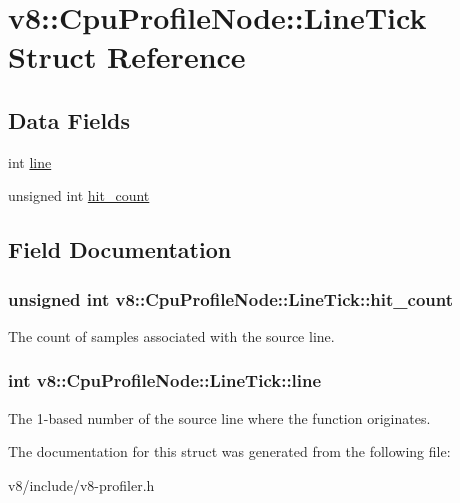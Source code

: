 \hypertarget{structv8_1_1CpuProfileNode_1_1LineTick}{}\section{v8\+:\+:Cpu\+Profile\+Node\+:\+:Line\+Tick Struct Reference}
\label{structv8_1_1CpuProfileNode_1_1LineTick}
\subsection*{Data Fields}
\begin{DoxyCompactItemize}
\item 
int \hyperlink{structv8_1_1CpuProfileNode_1_1LineTick_af96fbdefbc07b2c84cf41d74555626f6}{line}
\item 
unsigned int \hyperlink{structv8_1_1CpuProfileNode_1_1LineTick_a62653fb1e6d381a5747d24b83aab1c1b}{hit\+\_\+count}
\end{DoxyCompactItemize}


\subsection{Field Documentation}
\hypertarget{structv8_1_1CpuProfileNode_1_1LineTick_a62653fb1e6d381a5747d24b83aab1c1b}{}
\subsubsection[{hit\+\_\+count}]{\setlength{\rightskip}{0pt plus 5cm}unsigned int v8\+::\+Cpu\+Profile\+Node\+::\+Line\+Tick\+::hit\+\_\+count}\label{structv8_1_1CpuProfileNode_1_1LineTick_a62653fb1e6d381a5747d24b83aab1c1b}
The count of samples associated with the source line. \hypertarget{structv8_1_1CpuProfileNode_1_1LineTick_af96fbdefbc07b2c84cf41d74555626f6}{}
\subsubsection[{line}]{\setlength{\rightskip}{0pt plus 5cm}int v8\+::\+Cpu\+Profile\+Node\+::\+Line\+Tick\+::line}\label{structv8_1_1CpuProfileNode_1_1LineTick_af96fbdefbc07b2c84cf41d74555626f6}
The 1-\/based number of the source line where the function originates. 

The documentation for this struct was generated from the following file\+:\begin{DoxyCompactItemize}
\item 
v8/include/v8-\/profiler.\+h\end{DoxyCompactItemize}
